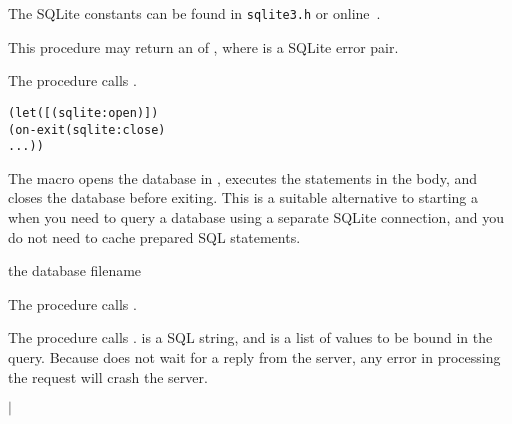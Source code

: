 The SQLite constants can be found in \texttt{sqlite3.h} or
online~\cite{sqlite}.

This procedure may return an  of , where  is a SQLite error
pair.

\begin{procedure}
\end{procedure}
\returns{}

The  procedure calls .

\begin{syntax}
\end{syntax}
\expandsto{} \antipar\begin{alltt}
(let ([ (sqlite:open  )])
  (on-exit (sqlite:close )
      ...))
\end{alltt}

The  macro opens the database in ,
executes the statements in the body, and closes the database before
exiting.  This is a suitable alternative to starting a
 when you need to query a database using a separate
SQLite connection, and you do not need to cache prepared SQL
statements.

\begin{procedure}
\end{procedure}
\returns{} the database filename

The  procedure calls .

\begin{procedure}
\end{procedure}
\returns{}

The  procedure calls .   is a SQL string, and
 is a list of values to be bound in the query.
Because  does not wait for a reply from the server, any
error in processing the request will crash the server.

\begin{procedure}
\end{procedure}
\returns{}
 $|$

